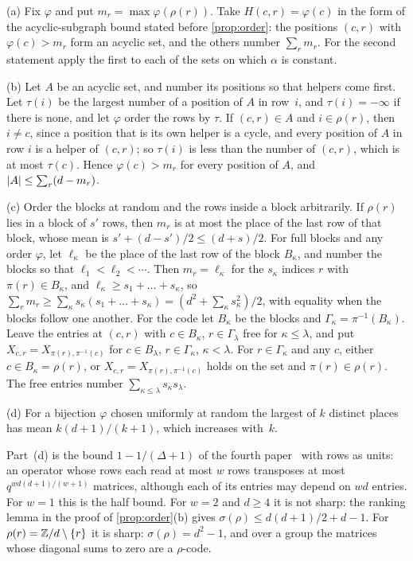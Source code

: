 \begin{informalproof}
(a) Fix $\varphi$ and put $m_r=\max\varphi(\rho(r))$. Take $H(c,r)=\varphi(c)$ in the form of the acyclic-subgraph
bound stated before \cref{prop:order}: the positions $(c,r)$ with $\varphi(c)>m_r$ form an acyclic set, and the
others number $\sum_rm_r$. For the second statement apply the first to each of the sets on which $\alpha$ is constant.

(b) Let $A$ be an acyclic set, and number its positions so that helpers come first. Let $\tau(i)$ be the largest
number of a position of $A$ in row~$i$, and $\tau(i)=-\infty$ if there is none, and let $\varphi$ order the rows by
$\tau$. If $(c,r)\in A$ and $i\in\rho(r)$, then $i\ne c$, since a position that is its own helper is a cycle, and
every position of $A$ in row $i$ is a helper of $(c,r)$; so $\tau(i)$ is less than the number of $(c,r)$, which is at
most $\tau(c)$. Hence $\varphi(c)>m_r$ for every position of $A$, and $\lvert A \rvert\le\sum_r(d-m_r)$.

(c) Order the blocks at random and the rows inside a block arbitrarily. If $\rho(r)$ lies in a block of $s'$ rows,
then $m_r$ is at most the place of the last row of that block, whose mean is $s'+(d-s')/2\le(d+s)/2$. For full
blocks and any order $\varphi$, let $\ell_\kappa$ be the place of the last row of the block $B_\kappa$, and number
the blocks so that $\ell_1<\ell_2<\cdots$. Then $m_r=\ell_\kappa$ for the $s_\kappa$ indices $r$ with
$\pi(r)\in B_\kappa$, and $\ell_\kappa\ge s_1+\dots+s_\kappa$, so
$\sum_rm_r\ge\sum_\kappa s_\kappa(s_1+\dots+s_\kappa)=(d^2+\sum_\kappa s_\kappa^2)/2$, with equality when the
blocks follow one another. For the code let $B_\kappa$ be the blocks and $\Gamma_\kappa=\pi^{-1}(B_\kappa)$.
Leave the entries at $(c,r)$ with $c\in B_\kappa$, $r\in\Gamma_\lambda$ free for $\kappa\le\lambda$, and put
$X_{c,r}=X_{\pi(r),\pi^{-1}(c)}$ for $c\in B_\lambda$, $r\in\Gamma_\kappa$, $\kappa<\lambda$. For $r\in\Gamma_\kappa$ and
any $c$, either $c\in B_\kappa=\rho(r)$, or $X_{c,r}=X_{\pi(r),\pi^{-1}(c)}$ holds on the set and
$\pi(r)\in\rho(r)$. The free entries number $\sum_{\kappa\le\lambda}s_\kappa s_\lambda$.

(d) For a bijection $\varphi$ chosen uniformly at random the largest of $k$ distinct places has mean
$k(d+1)/(k+1)$, which increases with~$k$.
\end{informalproof}

Part~(d) is the bound $1-1/(\Delta+1)$ of the fourth paper~\cite[Proposition~4.14(b)]{FourthPaper2026} with rows
as units: an operator whose rows each read at most $w$ rows transposes at most $q^{wd(d+1)/(w+1)}$ matrices,
although each of its entries may depend on $wd$ entries. For $w=1$ this is the half bound. For $w=2$ and $d\ge4$ it
is not sharp: the ranking lemma in the proof of \cref{prop:order}(b) gives $\sigma(\rho)\le d(d+1)/2+d-1$. For
$\rho(r)=\mathbb{Z}/d\setminus\{r\}$ it is sharp: $\sigma(\rho)=d^2-1$, and over a group the matrices whose diagonal sums to
zero are a $\rho$-code.

